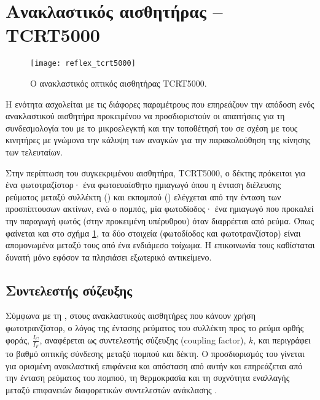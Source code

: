 \section{Ανακλαστικός αισθητήρας -- TCRT5000}

\begin{figure}
    \caption{Ο ανακλαστικός οπτικός αισθητήρας TCRT5000.
    \label{fig:reflex:tcrt5000}}
    \begin{center}
    \texttt{[image: reflex\_tcrt5000]}
    \end{center}
\end{figure}

Η ενότητα ασχολείται με τις διάφορες παραμέτρους που επηρεάζουν την απόδοση ενός
ανακλαστικού αισθητήρα προκειμένου να προσδιοριστούν οι απαιτήσεις για τη
συνδεσμολογία του με το μικροελεγκτή και την τοποθέτησή του σε σχέση με τους
κινητήρες με γνώμονα την κάλυψη των αναγκών για την παρακολούθηση της κίνησης
των τελευταίων.

Στην περίπτωση του συγκεκριμένου αισθητήρα, TCRT5000, ο δέκτης πρόκειται για ένα
φωτοτραζίστορ· ένα φωτοευαίσθητο ημιαγωγό όπου η ένταση διέλευσης ρεύματος
μεταξύ συλλέκτη () και εκπομπού () ελέγχεται από την
ένταση των προσπίπτουσων ακτίνων, ενώ ο πομπός, μία φωτοδίοδος· ένα ημιαγωγό που
προκαλεί την παραγωγή φωτός (στην προκειμένη υπέρυθρου) όταν διαρρέεται από
ρεύμα. Όπως φαίνεται και στο σχήμα \ref{fig:reflex:tcrt5000}, τα δύο στοιχεία
(φωτοδίοδος και φωτοτρανζίστορ) είναι απομονωμένα μεταξύ τους από ένα ενδιάμεσο
τοίχωμα. Η επικοινωνία τους καθίσταται δυνατή μόνο εφόσον τα πλησιάσει εξωτερικό
αντικείμενο.


\subsection{Συντελεστής σύζευξης}

Σύμφωνα με τη \textcite{vishay02}, στους ανακλαστικούς αισθητήρες που κάνουν
χρήση φωτοτρανζίστορ, ο λόγος της έντασης ρεύματος του συλλέκτη προς το ρεύμα
ορθής φοράς, $\frac{I_{C}}{I_{F}}$, αναφέρεται ως συντελεστής σύζευξης
 (coupling factor), $k$, και περιγράφει το
βαθμό οπτικής σύνδεσης μεταξύ πομπού και δέκτη.
Ο προσδιορισμός του γίνεται για ορισμένη ανακλαστική επιφάνεια και απόσταση από
αυτήν και επηρεάζεται από την ένταση ρεύματος του πομπού, τη θερμοκρασία και τη
συχνότητα εναλλαγής μεταξύ επιφανειών διαφορετικών συντελεστών ανάκλασης
\parencite{vishay02}.


